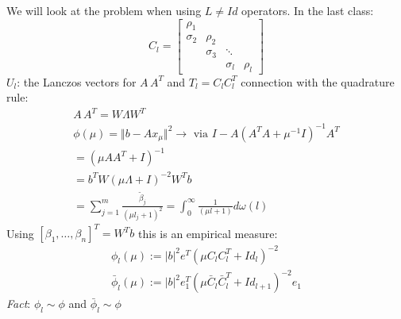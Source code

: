 We will look at the problem when using $L\neq Id$ operators. In the last class:
\[ C_l = \begin{bmatrix}
\rho_1 & & & \\
\sigma_2 & \rho_2 & & \\
         & \sigma_3 & \ddots & \\
         &          & \sigma_l & \rho_l 
\end{bmatrix} \]
$U_l$: the Lanczos vectors for $A\, A^T$ and $T_l = C_l C_l^T$ connection with the quadrature rule:
\begin{gather*}
A\, A^T = W\Lambda W^T\\
\phi(\mu) = \Vert b - Ax_\mu \Vert ^2 \to \text{ via } I-A(A^TA + \mu^{-1} I )^{-1} A^T\\ 
= (\mu A A^T + I )^{-1}\\
= b^T W(\mu \Lambda + I )^{-2} W^T b\\
=\sum_{j=1}^m \frac{\tilde \beta_j}{(\mu l_j + 1)^2} = \int_0^\infty \frac{1}{(\mu l + 1)} d\omega (l)
\end{gather*}
Using $[\beta_1,\ldots, \beta_n]^T = W^T b $ this is an empirical measure:
\begin{gather*}
\phi_l(\mu) := |b|^2 e^T(\mu C_l C_l ^T + Id_l )^{-2} \\
\bar \phi_l(\mu) :=|b|^2 e_1^T(\mu \bar C_l \bar C_l ^T + Id_{l+1} )^{-2}e_1 
\end{gather*}
\emph{Fact}: $\phi_l \sim \phi$ and $\bar \phi_l \sim \phi$


